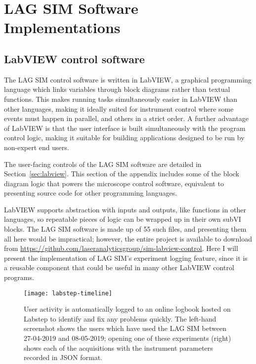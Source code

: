 \chapter{LAG SIM Software Implementations} 

\ifpdf
    \graphicspath{{Appendix1/Figs/Raster/}{Appendix1/Figs/PDF/}{Appendix1/Figs/}}
\else
    \graphicspath{{Appendix1/Figs/Vector/}{Appendix1/Figs/}}
\fi

\section{LabVIEW control software} \label{appx:labview-lagsim}
The LAG SIM control software is written in LabVIEW, a graphical programming language which links variables through block diagrams rather than textual functions. 
This makes running tasks simultaneously easier in LabVIEW than other languages, making it ideally suited for instrument control where some events must happen in parallel, and others in a strict order.
A further advantage of LabVIEW is that the user interface is built simultaneously with the program control logic, making it suitable for building applications designed to be run by non-expert end users. 

The user-facing controls of the LAG SIM software are detailed in Section~\ref{sec:labview}. 
This section of the appendix includes some of the block diagram logic that powers the microscope control software, equivalent to presenting source code for other programming languages. 

LabVIEW supports abstraction with inputs and outputs, like functions in other languages, so repeatable pieces of logic can be wrapped up in their own subVI blocks. 
The LAG SIM software is made up of 55 such files, and presenting them all here would be impractical; however, the entire project is available to download from \url{https://github.com/laseranalyticsgroup/sim-labview-control}. 
Here I will present the implementation of LAG SIM's experiment logging feature, since it is a reusable component that could be useful in many other LabVIEW control programs. 

\begin{sidewaysfigure}[p]
\centering
\texttt{[image: labstep-timeline]}
\caption[Logging user activity with Labstep allows any problems to be identified and fixed quickly]{User activity is automatically logged to an online logbook hosted on Labstep to identify and fix any problems quickly. The left-hand screenshot shows the users which have used the LAG SIM between 27-04-2019 and 08-05-2019; opening one of these experiments (right) shows each of the acquisitions with the instrument parameters recorded in JSON format.}
\label{fig:labstepTimeline}
\end{sidewaysfigure}

